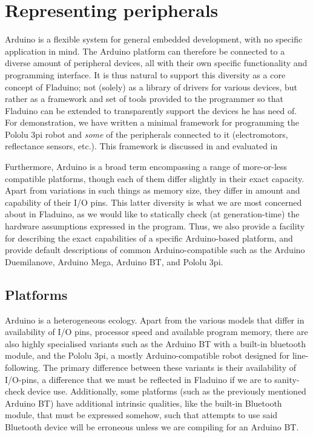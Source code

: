 \documentclass[a4paper, oneside, final]{memoir}
\let\Fref\undefined
\begin{document}
\section{Representing peripherals} 

Arduino is a flexible system for general embedded development, with no
specific application in mind.  The Arduino platform can therefore be
connected to a diverse amount of peripheral devices, all with their
own specific functionality and programming interface.  It is thus
natural to support this diversity as a core concept of Fladuino; not
(solely) as a library of drivers for various devices, but rather as a
framework and set of tools provided to the programmer so that Fladuino
can be extended to transparently support the devices he has need of.
For demonstration, we have written a minimal framework for programming
the Pololu 3pi robot and \textit{some} of the peripherals connected to
it (electromotors, reflectance sensors, etc.). This framework is
discussed in \Fref[plain]{chap:example code} and evaluated in
\Fref[plain]{chap:evaluation}

Furthermore, Arduino is a broad term encompassing a range of
more-or-less compatible platforms, though each of them differ slightly
in their exact capacity.  Apart from variations in such things as
memory size, they differ in amount and capability of their I/O pins.
This latter diversity is what we are most concerned about in Fladuino,
as we would like to statically check (at generation-time) the hardware
assumptions expressed in the program.  Thus, we also provide a
facility for describing the exact capabilities of a specific
Arduino-based platform, and provide default descriptions of common
Arduino-compatible such as the Arduino Duemilanove, Arduino Mega,
Arduino BT, and Pololu 3pi.



\subsection{Platforms}
\label{sec:platforms}

Arduino is a heterogeneous ecology.  Apart from the various models
that differ in availability of I/O pins, processor speed and available
program memory, there are also highly specialised variants such as the
Arduino BT with a built-in bluetooth module, and the Pololu 3pi, a
mostly Arduino-compatible robot designed for line-following.  The
primary difference between these variants is their availability of
I/O-pins, a difference that we must be reflected in Fladuino if we are
to sanity-check device use.  Additionally, some platforms (such as the
previously mentioned Arduino BT) have additional intrinsic qualities,
like the built-in Bluetooth module, that must be expressed somehow,
such that attempts to use said Bluetooth device will be erroneous
unless we are compiling for an Arduino BT.
\end{document}
